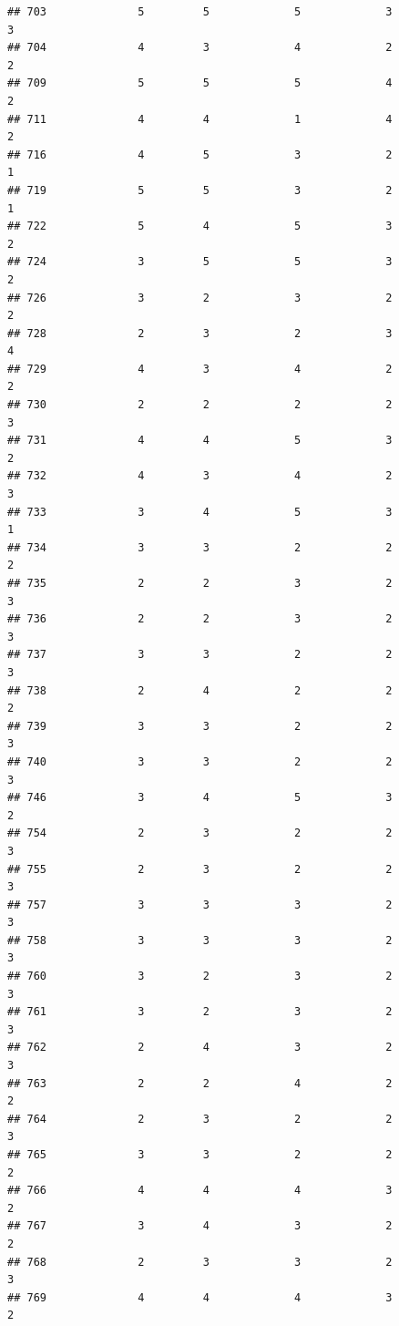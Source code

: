 \documentclass[
]{article}
\begin{document}
\begin{verbatim}
## 703              5         5             5             3           3
## 704              4         3             4             2           2
## 709              5         5             5             4           2
## 711              4         4             1             4           2
## 716              4         5             3             2           1
## 719              5         5             3             2           1
## 722              5         4             5             3           2
## 724              3         5             5             3           2
## 726              3         2             3             2           2
## 728              2         3             2             3           4
## 729              4         3             4             2           2
## 730              2         2             2             2           3
## 731              4         4             5             3           2
## 732              4         3             4             2           3
## 733              3         4             5             3           1
## 734              3         3             2             2           2
## 735              2         2             3             2           3
## 736              2         2             3             2           3
## 737              3         3             2             2           3
## 738              2         4             2             2           2
## 739              3         3             2             2           3
## 740              3         3             2             2           3
## 746              3         4             5             3           2
## 754              2         3             2             2           3
## 755              2         3             2             2           3
## 757              3         3             3             2           3
## 758              3         3             3             2           3
## 760              3         2             3             2           3
## 761              3         2             3             2           3
## 762              2         4             3             2           3
## 763              2         2             4             2           2
## 764              2         3             2             2           3
## 765              3         3             2             2           2
## 766              4         4             4             3           2
## 767              3         4             3             2           2
## 768              2         3             3             2           3
## 769              4         4             4             3           2

\end{verbatim}
\end{document}
